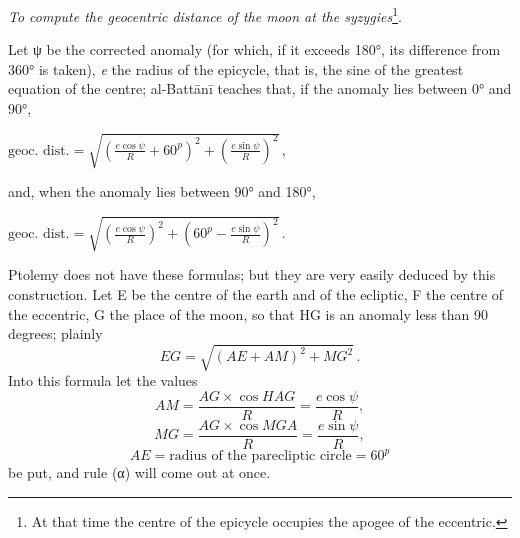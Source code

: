 \documentclass[11pt]{article}
\newcommand{\Pg}[1]{\marginpar{\footnotesize\color{gray}#1}}
\begin{document}
\par \emph{To compute the geocentric distance of the moon at the syzygies}\footnote{At that time the centre of the epicycle occupies the apogee of the eccentric.}.\par
\par \Pg{I 254}Let {\greekfont ψ} be the corrected anomaly (for which, if it exceeds 180°, its difference from 360° is taken), \emph{e} the radius of the epicycle, that is, the sine of the greatest equation of the centre; al-Battānī teaches that, if the anomaly lies between 0° and 90°, \par\noindent\hspace*{1.5em}$\displaystyle \text{geoc. dist.} = \sqrt{\left(\frac{e\cos\psi}{R} + 60^{p}\right)^{2} + \left(\frac{e\sin\psi}{R}\right)^{2}}\,,$\par and, when the anomaly lies between 90° and 180°, \par\noindent\hspace*{1.5em}$\displaystyle \text{geoc. dist.} = \sqrt{\left(\frac{e\cos\psi}{R}\right)^{2} + \left(60^{p} - \frac{e\sin\psi}{R}\right)^{2}}\,.$\par\par
\begin{center}\end{center}
\par Ptolemy does not have these formulas; but they are very easily deduced by this construction. Let E be the centre of the earth and of the ecliptic, F the centre of the eccentric, G the place of the moon, so that HG is an anomaly less than 90 degrees; plainly \[ EG = \sqrt{(AE + AM)^{2} + MG^{2}}\,. \] Into this formula let the values \[ AM = \frac{AG \times \cos HAG}{R} = \frac{e\cos\psi}{R}, \] \[ MG = \frac{AG \times \cos MGA}{R} = \frac{e\sin\psi}{R}, \] \[ AE = \text{radius of the parecliptic circle} = 60^{p} \] be put, and rule ({\greekfont α}) will come out at once.\par
\par [What the author adds in lines 25–26, «\emph{from each degree of this distance subtract a minute}» etc., is of little use: for the distance of the moon \emph{from the surface of the earth} is never the same as the distance of the moon \emph{from the place of observation}, which recent astronomers use to compute the apparent diameter of the moon. It should also be noted that even at the syzygies the distance of the moon from the centre of the earth is hardly ever equal to 60 parts: whence it is plain that the rule also departs somewhat from the truth. It would have been better to subtract one part from the sixty parts of which the distance AE consists. — Schiaparelli.]\par
\end{document}
